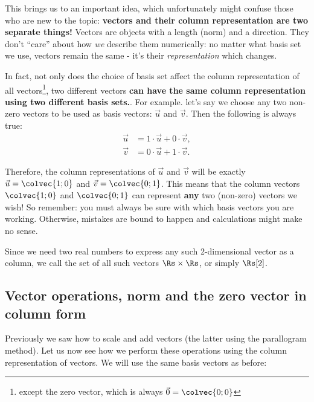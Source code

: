 This brings us to an important idea, which unfortunately might confuse those who are new to the topic: \textbf{vectors and their column representation are two separate things!} Vectors are objects with a length (norm) and a direction. They don't ``care'' about how \textit{we} describe them numerically: no matter what basis set we use, vectors remain the same - it's their \textit{representation} which changes.

In fact, not only does the choice of basis set affect the column representation of all vectors\footnote{except the zero vector, which is always $\vec{0}=\colvec{0;0}$}, two different vectors \textbf{can have the same column representation using two different basis sets.}. For example. let's say we choose any two non-zero vectors to be used as basis vectors: $\vec{u}$ and $\vec{v}$. Then the following is always true:
\begin{align*}
  \vec{u} &= 1\cdot\vec{u} + 0\cdot\vec{v},\\
  \vec{v} &= 0\cdot\vec{u} + 1\cdot\vec{v}.
\end{align*}

Therefore, the column representations of $\vec{u}$ and $\vec{v}$ will be exactly $\vec{u}=\colvec{1;0}$ and $\vec{v}=\colvec{0;1}$. This means that the column vectors $\colvec{1;0}$ and $\colvec{0;1}$ can represent \textbf{any} two (non-zero) vectors we wish! So remember: you must always be sure with which basis vectors you are working. Otherwise, mistakes are bound to happen and calculations might make no sense.


Since we need two real numbers to express any such 2-dimensional vector as a column, we call the set of all such vectors $\Rs\times\Rs$, or simply $\Rs[2]$.

\subsection{Vector operations, norm and the zero vector in column form}
Previously we saw how to scale and add vectors (the latter using the parallogram method). Let us now see how we perform these operations using the column representation of vectors. We will use the same basis vectors as before:

\begin{center}
\end{center}

